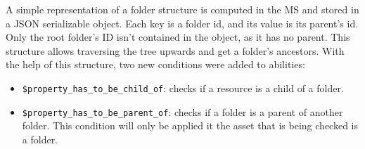 %
%
%
%
%
%
%
%


A simple representation of a folder structure is computed in the MS
and stored in a JSON serializable object.
Each key is a folder id, and its value is its parent's id.
Only the root folder's ID isn't contained in the object, as it has no parent.
This structure allows traversing the tree upwards and get a folder's ancestors.
With the help of this structure, two new conditions were added to abilities:

\begin{itemize}
  \item \lstinline{$property_has_to_be_child_of}: checks if a resource is a child of a folder.
  \item \lstinline{$property_has_to_be_parent_of}: checks if a folder is a parent of
    another folder. This condition will only be applied it the asset that is being checked
    is a folder.
\end{itemize}

